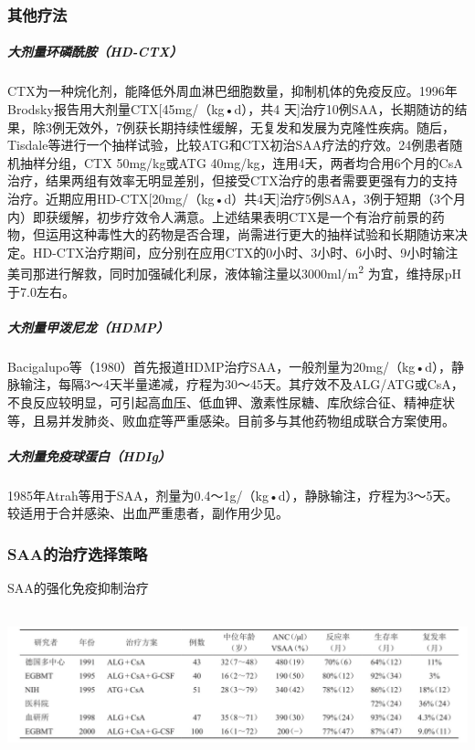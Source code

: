 \subsubsection{其他疗法}

\subparagraph{大剂量环磷酰胺（HD-CTX）}

CTX为一种烷化剂，能降低外周血淋巴细胞数量，抑制机体的免疫反应。1996年Brodsky报告用大剂量CTX{[}45mg/（kg•d），共4
天{]}治疗10例SAA，长期随访的结果，除3例无效外，7例获长期持续性缓解，无复发和发展为克隆性疾病。随后，Tisdale等进行一个抽样试验，比较ATG和CTX初治SAA疗法的疗效。24例患者随机抽样分组，CTX
50mg/kg或ATG
40mg/kg，连用4天，两者均合用6个月的CsA治疗，结果两组有效率无明显差别，但接受CTX治疗的患者需要更强有力的支持治疗。近期应用HD-CTX{[}20mg/（kg•d）共4天{]}治疗5例SAA，3例于短期（3个月内）即获缓解，初步疗效令人满意。上述结果表明CTX是一个有治疗前景的药物，但运用这种毒性大的药物是否合理，尚需进行更大的抽样试验和长期随访来决定。HD-CTX治疗期间，应分别在应用CTX的0小时、3小时、6小时、9小时输注美司那进行解救，同时加强碱化利尿，液体输注量以3000ml/m\textsuperscript{2}
为宜，维持尿pH于7.0左右。

\subparagraph{大剂量甲泼尼龙（HDMP）}

Bacigalupo等（1980）首先报道HDMP治疗SAA，一般剂量为20mg/（kg•d），静脉输注，每隔3～4天半量递减，疗程为30～45天。其疗效不及ALG/ATG或CsA，不良反应较明显，可引起高血压、低血钾、激素性尿糖、库欣综合征、精神症状等，且易并发肺炎、败血症等严重感染。目前多与其他药物组成联合方案使用。

\subparagraph{大剂量免疫球蛋白（HDIg）}

1985年Atrah等用于SAA，剂量为0.4～1g/（kg•d），静脉输注，疗程为3～5天。较适用于合并感染、出血严重患者，副作用少见。

\subsubsection{SAA的治疗选择策略}

\begin{table}[htbp]
\centering
\caption{SAA的强化免疫抑制治疗}
\label{tab34-3}
\includegraphics[width=6.77083in,height=1.70833in]{./images/Image00128.jpg}
\end{table}

